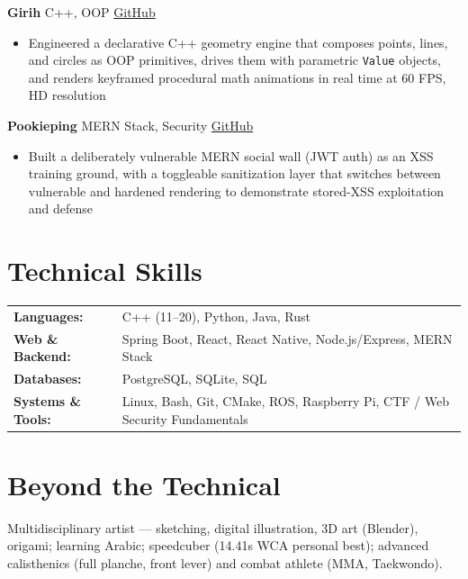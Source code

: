 \documentclass[10.5pt,letterpaper]{article}
\newcommand{\link}[2]{\href{#1}{\textcolor{accent}{#2}}}
\begin{document}
\textbf{Girih} \;\textbar\; C++, OOP \;\textbar\; \link{https://github.com/rbwkai}{GitHub}
\begin{itemize}
  \item Engineered a declarative C++ geometry engine that composes points, lines, and circles as OOP primitives, drives them with parametric \texttt{Value} objects, and renders keyframed procedural math animations in real time at 60 FPS, HD resolution
\end{itemize}

\textbf{Pookieping} \;\textbar\; MERN Stack, Security \;\textbar\; \link{https://github.com/rbwkai}{GitHub}
\begin{itemize}
  \item Built a deliberately vulnerable MERN social wall (JWT auth) as an XSS training ground, with a toggleable sanitization layer that switches between vulnerable and hardened rendering to demonstrate stored-XSS exploitation and defense
\end{itemize}

\section{Technical Skills}
\begin{tabularx}{\textwidth}{@{}l X@{}}
  \textbf{Languages:} & C++ (11--20), Python, Java, Rust \\[2pt]
  \textbf{Web \& Backend:} & Spring Boot, React, React Native, Node.js/Express, MERN Stack \\[2pt]
  \textbf{Databases:} & PostgreSQL, SQLite, SQL \\[2pt]
  \textbf{Systems \& Tools:} & Linux, Bash, Git, CMake, ROS, Raspberry Pi, CTF / Web Security Fundamentals \\
\end{tabularx}

\section{Beyond the Technical}
Multidisciplinary artist --- sketching, digital illustration, 3D art (Blender), origami; learning Arabic; speedcuber (14.41s WCA personal best); advanced calisthenics (full planche, front lever) and combat athlete (MMA, Taekwondo).
\end{document}

